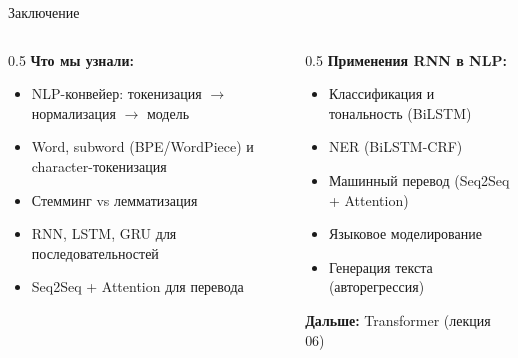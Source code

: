 \documentclass[aspectratio=169, 9pt]{beamer}
\begin{document}
\begin{frame}{Заключение}
  \begin{columns}[T]
    \begin{column}{0.5\textwidth}
      \textbf{Что мы узнали:}
      \begin{itemize}
        \item NLP-конвейер: токенизация $\to$ нормализация $\to$ модель
        \item Word, subword (BPE/WordPiece) и character-токенизация
        \item Стемминг vs лемматизация
        \item RNN, LSTM, GRU для последовательностей
        \item Seq2Seq + Attention для перевода
      \end{itemize}
    \end{column}
    \begin{column}{0.5\textwidth}
      \textbf{Применения RNN в NLP:}
      \begin{itemize}
        \item Классификация и тональность (BiLSTM)
        \item NER (BiLSTM-CRF)
        \item Машинный перевод (Seq2Seq + Attention)
        \item Языковое моделирование
        \item Генерация текста (авторегрессия)
      \end{itemize}
      
      \vspace{0.5em}
      \textbf{Дальше:} Transformer (лекция 06)
    \end{column}
  \end{columns}
\end{frame}
\end{document}
